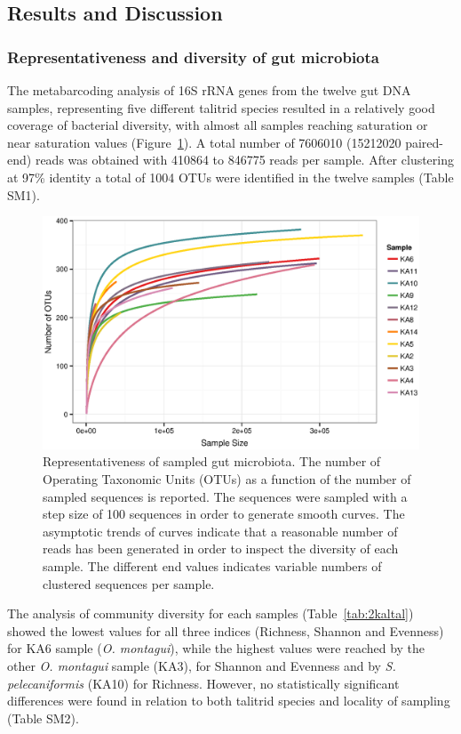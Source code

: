 \subsection{Results and Discussion}

\subsubsection{Representativeness and diversity of gut microbiota}
The metabarcoding analysis of 16S rRNA genes from the twelve gut DNA samples, representing five different talitrid species resulted in a relatively good coverage of bacterial diversity, with almost all samples reaching saturation or near saturation values (Figure~\ref{fig:1talkal}). A total number of 7606010 (15212020 paired-end) reads was obtained with 410864 to 846775 reads per sample. After clustering at 97\% identity a total of 1004 OTUs were identified in the twelve samples (Table SM1).\\%
\begin{figure}[!tb]
	\centering
	\includegraphics[width=1\textwidth]{./figures/Chapter_6/Figure_1_talkaled.eps}
  	\caption{Representativeness of sampled gut microbiota. The number of Operating Taxonomic Units (OTUs) as a function of the number of sampled sequences is reported. The sequences were sampled with a step size of 100 sequences in order to generate smooth curves. The asymptotic trends of curves indicate that a reasonable number of reads has been generated in order to inspect the diversity of each sample. The different end values indicates variable numbers of clustered sequences per sample.\label{fig:1talkal}}
\end{figure}%
The analysis of community diversity for each samples (Table~\ref{tab:2kaltal}) showed  the lowest values for all three indices (Richness, Shannon and Evenness) for KA6 sample (\textit{O. montagui}), while the highest values were reached by the other \textit{O. montagui} sample (KA3), for Shannon and Evenness and by \textit{S. pelecaniformis} (KA10) for Richness. However, no statistically significant differences were found in relation to both talitrid species and locality of sampling (Table SM2).\\
